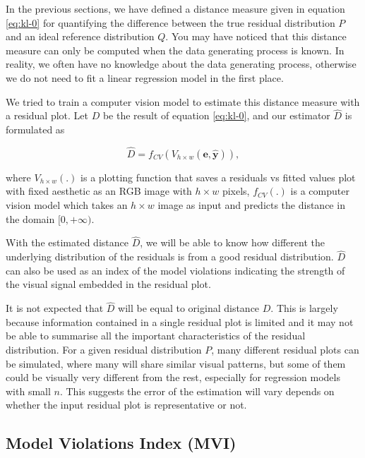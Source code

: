 \documentclass[]{interact}
\theoremstyle{plain}%
\theoremstyle{definition}
\theoremstyle{remark}
\begin{document}
In the previous sections, we have defined a distance measure given in
equation \ref{eq:kl-0} for quantifying the difference between the true
residual distribution \(P\) and an ideal reference distribution \(Q\).
You may have noticed that this distance measure can only be computed
when the data generating process is known. In reality, we often have no
knowledge about the data generating process, otherwise we do not need to
fit a linear regression model in the first place.

We tried to train a computer vision model to estimate this distance
measure with a residual plot. Let \(D\) be the result of equation
\ref{eq:kl-0}, and our estimator \(\hat{D}\) is formulated as

\begin{equation}
\label{eq:d-approx}
\hat{D} = f_{CV}(V_{h \times w}(\boldsymbol{e}, \hat{\boldsymbol{y}})),
\end{equation}

\noindent where \(V_{h \times w}(.)\) is a plotting function that saves
a residuals vs fitted values plot with fixed aesthetic as an RGB image
with \(h \times w\) pixels, \(f_{CV}(.)\) is a computer vision model
which takes an \(h \times w\) image as input and predicts the distance
in the domain \([0, +\infty)\).

With the estimated distance \(\hat{D}\), we will be able to know how
different the underlying distribution of the residuals is from a good
residual distribution. \(\hat{D}\) can also be used as an index of the
model violations indicating the strength of the visual signal embedded
in the residual plot.

It is not expected that \(\hat{D}\) will be equal to original distance
\(D\). This is largely because information contained in a single
residual plot is limited and it may not be able to summarise all the
important characteristics of the residual distribution. For a given
residual distribution \(P\), many different residual plots can be
simulated, where many will share similar visual patterns, but some of
them could be visually very different from the rest, especially for
regression models with small \(n\). This suggests the error of the
estimation will vary depends on whether the input residual plot is
representative or not.

\subsection{Model Violations Index
(MVI)}\label{sec:model-violations-index}
\end{document}
